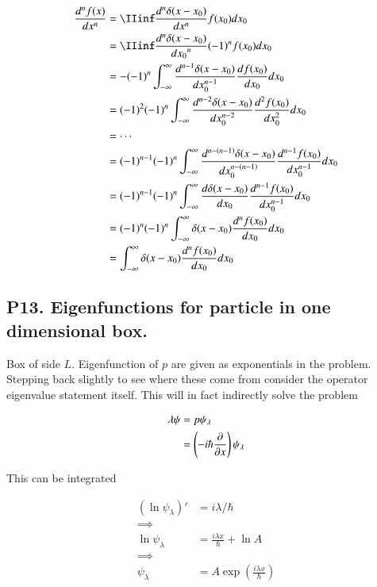 \documentclass{article}
\begin{document}
\begin{align*}
\frac{d^n f(x)}{dx^n} 
&= \IIinf \frac{d^n \delta(x - x_0)}{dx^n} f(x_0) dx_0 \\
&= \IIinf \frac{d^n \delta(x-x_0)}{{dx_0}^n} (-1)^n f(x_0) dx_0 \\
&= -(-1)^n \int_{-\infty}^{\infty} \frac{d^{n-1} \delta(x - x_0)}{dx_0^{n-1}} \frac{df(x_0)}{dx_0} dx_0 \\
&= (-1)^2 (-1)^n \int_{-\infty}^{\infty} \frac{d^{n-2} \delta(x - x_0)}{dx_0^{n-2}} \frac{d^2 f(x_0)}{dx_0^2} dx_0 \\
&= \cdots \\
&= (-1)^{n-1} (-1)^n \int_{-\infty}^{\infty} \frac{d^{n-(n-1)} \delta(x - x_0)}{dx_0^{n-(n-1)}} \frac{d^{n-1} f(x_0)}{dx_0^{n-1}} dx_0 \\
&= (-1)^{n-1} (-1)^n \int_{-\infty}^{\infty} \frac{d \delta(x - x_0)}{dx_0} \frac{d^{n-1} f(x_0)}{dx_0^{n-1}} dx_0 \\
&= (-1)^n (-1)^n \int_{-\infty}^{\infty} \delta(x - x_0) \frac{d^n f(x_0)}{dx_0} dx_0 \\
&= \int_{-\infty}^{\infty} \delta(x - x_0) \frac{d^n f(x_0)}{dx_0} dx_0 \\
\end{align*}

\subsection{P13. Eigenfunctions for particle in one dimensional box. }

Box of side $L$.  Eigenfunction of $p$ are given as exponentials in the problem.  Stepping back slightly to see where these come from 
consider the operator eigenvalue statement itself.  This will in fact indirectly solve the problem

\begin{align*}
\lambda \psi 
&= p \psi_\lambda \\
&= \left(-i \hbar \frac{\partial {}}{\partial {x}} \right) \psi_\lambda \\
\end{align*}

This can be integrated

\begin{align*}
(\ln \psi_\lambda)' &= i \lambda/\hbar \\
\implies \\
\ln \psi_\lambda &= \frac{i \lambda x }{\hbar} + \ln A \\
\implies \\
\psi_\lambda &= A \exp\left( \frac{i \lambda x }{\hbar} \right) \\
\end{align*}
\end{document}
